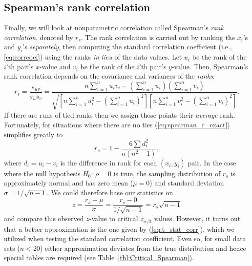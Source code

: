\subsection{Spearman's rank correlation}

	Finally, we will look at nonparametric correlation called Spearman's \emph{rank correlation},
denoted by $r_s$.  The rank correlation is carried out by ranking the $x_i$'s and $y_i$'s 
\emph{separately}, then computing the standard correlation coefficient (i.e., \ref{eq:corrcoef}) using the ranks \emph{in lieu} of the data values. Let
$u_i$ be the rank of the $i$'th pair's $x$-value and $v_i$ be the rank of the $i$'th pair's $y$-value.  Then,
Spearman's rank correlation depends on the covariance and variances of the \emph{ranks}: 
\begin{equation}
r_s = \frac{s_{uv}}{s_u s_v} = \frac{n \sum_{i=1}^n u_i v_i - \left(\sum_{i=1}^n u_i \right)\left(\sum_{i=1}^n v_i \right)}{\sqrt{\left [n \sum_{i=1}^n u_i^2 - \left(\sum_{i=1}^n u_i \right)^2 \right] \left [n \sum_{i=1}^n v_i^2 - \left(\sum_{i=1}^n v_i \right)^2 \right]}}.
\label{eq:spearman_r_exact}
\end{equation}
If there are runs of tied ranks then we assign those points their \emph{average} rank. Fortunately, for
situations where there are no ties (\ref{eq:spearman_r_exact}) simplifies greatly to
\begin{equation}
r_s = 1 - \frac{6\sum d^2_i}{n(n^2 - 1)},
\label{eq:spearman_r}
\end{equation}
where $d_i = u_i - v_i$ is the difference in rank for each $(x_i, y_i)$ pair.
In the case where the null hypothesis $H_0$: $\rho = 0$ is true, the sampling distribution of $r_s$ is approximately normal and
has zero mean ($\mu = 0$) and standard deviation $\sigma = 1/\sqrt{n-1}$.  We could therefore base our statistics on 
\begin{equation}
z = \frac{r_s - \mu}{\sigma} = \frac{r_s - 0}{1/\sqrt{n-1}} = r _s\sqrt{n-1}
\label{eq:z_spearman}
\end{equation}
and compare this observed $z$-value to critical $z_{ \alpha / 2}$ values.
However, it turns out that a better approximation is the one given by (\ref{eq:t_stat_corr}), which we utilized when testing
the standard correlation coefficient.  Even so, for small data sets ($n < 20$) either approximation deviates
from the true distribution and hence special tables are required (see Table~\ref{tbl:Critical_Spearman}).

